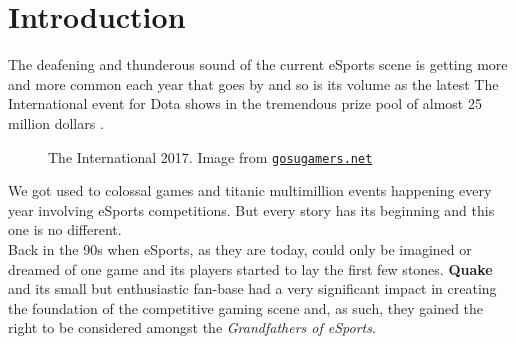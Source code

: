 \section{Introduction}
\label{sec::introduction}

The deafening and thunderous sound of the current eSports scene is getting more and more common each year that goes by and so is its volume as the latest The International event for Dota shows in the tremendous prize pool of almost 25 million dollars \citep{esportsEarnings}.\\


\begin{figure}
\begin{center}

	\caption{The International 2017. Image from \href{http://www.gosugamers.net/dota2/news/44947-the-international-2017-prize-pool-shatters-ti6-record}{\nolinkurl{gosugamers.net}}}
\end{center}
\end{figure}



We got used to colossal games and titanic multimillion events happening every year involving eSports competitions. But every story has its beginning and this one is no different.\\

Back in the 90s when eSports, as they are today, could only be imagined or dreamed of one game and its players started to lay the first few stones. \textbf{Quake} and its small but enthusiastic fan-base had a very significant impact in creating the foundation of the competitive gaming scene and, as such, they gained the right to be considered amongst the \textit{Grandfathers of eSports}.\\

